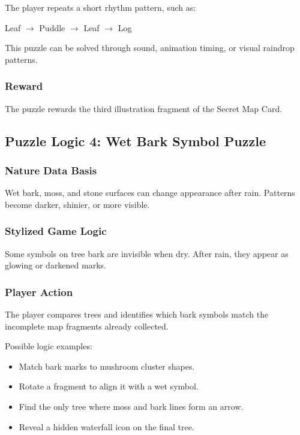 \documentclass[12pt]{article}
\begin{document}
The player repeats a short rhythm pattern, such as:

\begin{center}
Leaf $\rightarrow$ Puddle $\rightarrow$ Leaf $\rightarrow$ Log
\end{center}

This puzzle can be solved through sound, animation timing, or visual raindrop patterns.

\subsubsection{Reward}

The puzzle rewards the third illustration fragment of the Secret Map Card.

\subsection{Puzzle Logic 4: Wet Bark Symbol Puzzle}

\subsubsection{Nature Data Basis}

Wet bark, moss, and stone surfaces can change appearance after rain. Patterns become darker, shinier, or more visible.

\subsubsection{Stylized Game Logic}

Some symbols on tree bark are invisible when dry. After rain, they appear as glowing or darkened marks.

\subsubsection{Player Action}

The player compares trees and identifies which bark symbols match the incomplete map fragments already collected.

Possible logic examples:

\begin{itemize}[leftmargin=*]
    \item Match bark marks to mushroom cluster shapes.
    \item Rotate a fragment to align it with a wet symbol.
    \item Find the only tree where moss and bark lines form an arrow.
    \item Reveal a hidden waterfall icon on the final tree.
\end{itemize}
\end{document}
